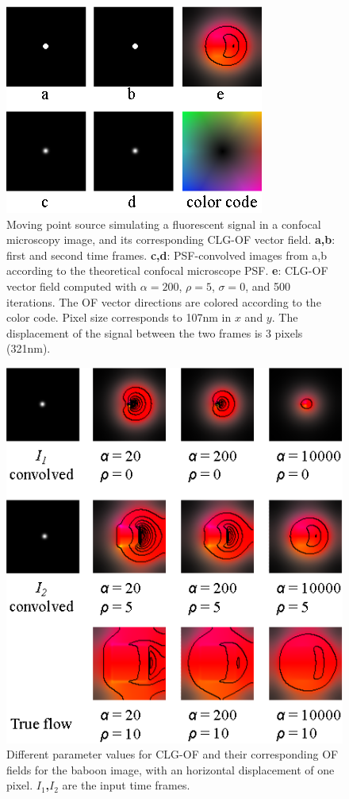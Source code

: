 \documentclass{article}
\begin{document}
\begin{figure}
 \centering
 \includegraphics{./img/ex_dot_convol.png}
 \caption{Moving point source simulating a fluorescent signal in a confocal 
          microscopy image, and its corresponding CLG-OF vector field.
          \textbf{a,b}: first and second time frames. \textbf{c,d}: PSF-convolved 
          images from a,b according to the theoretical confocal microscope PSF. 
          \textbf{e}: CLG-OF vector field computed with $\alpha = 200$, $\rho = 5$, 
          $\sigma = 0$, and 500 iterations. The OF vector directions are colored 
          according to the color code. Pixel size corresponds to 107nm in 
          $x$ and $y$. The displacement of the signal between the two frames is 
          3 pixels (321nm).}
 \label{fig:ex1}
\end{figure}



\begin{figure}
 \centering
 \includegraphics{./img/ex_dot.png}
 \caption{Different parameter values for CLG-OF and their corresponding OF fields 
          for the baboon image, with an horizontal displacement of one pixel.
          \textbf{$I_1$,$I_2$} are the input time frames.}
 \label{fig:ex2}
\end{figure}
\end{document}
